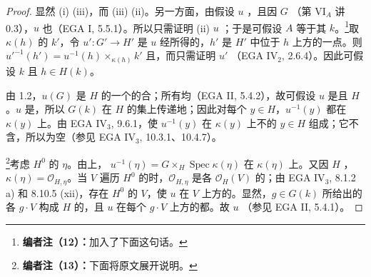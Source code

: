 \begin{proof}
显然 (i)  (iii)，而 (iii)  (ii)。另一方面，由假设 $u$ ，且因 $G$ （第 VI$_A$ 讲 0.3），$u$ 也（EGA I, 5.5.1）。所以只需证明 (ii)  $u$ ；于是可假设 $A$ 等于其 $k$。\footnote{\textbf{编者注（12）：}加入了下面这句话。}取 $\kappa(h)$ 的 $k'$，令 $u':G'\to H'$ 是 $u$ 经所得的，$h'$ 是 $H'$ 中位于 $h$ 上方的一点。则 $u'^{-1}(h')=u^{-1}(h)\times_{\kappa(h)}k'$
且，而只需证明 $u'$ （EGA IV$_2$, 2.6.4）。因此可假设 $k$ 且 $h\in H(k)$。

由 1.2，$u(G)$ 是 $H$ 的一个的合；所有均（EGA II, 5.4.2），故可假设 $u$ 是且 $H$ 。$u$ 是，所以 $G(k)$ 在 $H$ 的集上传递地；因此对每个 $y\in H$，$u^{-1}(y)$ 都在 $\kappa(y)$ 上。由 EGA IV$_3$, 9.6.1，使 $u^{-1}(y)$ 在 $\kappa(y)$ 上不的 $y\in H$ 组成；它不含，所以为空（参见 EGA IV$_3$, 10.3.1、10.4.7）。

\footnote{\textbf{编者注（13）：}下面将原文展开说明。}考虑 $H^0$ 的 $\eta$。由上， $u^{-1}(\eta)=G\times_H\operatorname{Spec}\kappa(\eta)$ 在 $\kappa(\eta)$ 上。又因 $H$ ，$\kappa(\eta)=\mathcal O_{H,\eta}$。当 $V$ 遍历 $H^0$ 的时，$\mathcal O_{H,\eta}$ 是各 $\mathcal O_H(V)$ 的；由 EGA IV$_3$, 8.1.2 a) 和 8.10.5 (xii)，存在 $H^0$ 的 $V$，使 $u$ 在 $V$ 上方的。显然，$g\in G(k)$ 所给出的各 $g\cdot V$ 构成 $H$ 的，且 $u$ 在每个 $g\cdot V$ 上方的都。故 $u$ （参见 EGA II, 5.4.1）。
\end{proof}
